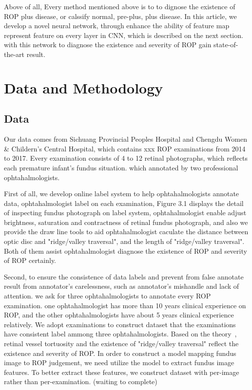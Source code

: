\documentclass[10pt,twocolumn,letterpaper]{article}
\begin{document}
  Above of all,
  Every method mentioned above is to to dignose the existence of ROP plus disease, or calssify normal, pre-plus, plus
  disease. In this article, we develop a novel neural network, through enhance the ability of feature map represent feature on every layer in CNN, which is described on the next section. with this network to diagnose the existence and severity of ROP gain state-of-the-art result.

\section{Data and Methodology}
\subsection{Data}
	Our data comes from Sichuang Provincial Peoples Hospital and Chengdu Women \& Childern's Central Hospital, which contains xxx ROP examinations from 2014 to 2017. Every examination consists of 4 to 12 retinal photographs, which reflects each premature infant's fundus situation.
  which annotated by two professional ophtahalmologists.

  First of all, we develop online label system to help ophtahalmologists annotate data, ophtahalmologist label on each examination, Figure 3.1 displays the detail of inspecting fundus photograph on label system, ophtahalmologist enable adjust brightness, saturation and contractness of retinal fundus photograph, and also we provide the draw line tools to aid ophtahalmologist caculate the distance between optic disc and "ridge/valley traversal", and the length of "ridge/valley traversal". Both of them assist ophtahalmologist diagnose the existence of ROP and severity of ROP certainly.

  Second, to ensure the consistence of data labels and prevent from false annotate result from annotator's carelessness, such as annotator's mishandle and lack of attention. we ask for three ophtahalmologists to annotate every ROP examination. one ophtahalmologist has more than 10 years clinical experience on ROP, and the other ophtahalmologists have about 5 years clinical experience relatively. We adopt examinations to construct dataset that the examinations have consistent label ammong three ophtahalmologists. Based on the theory~\cite{Alpher01}, retinal vessel tortuosity and the existence of "ridge/valley traversal" reflect the existence and severity of ROP. In order to construct a model mapping fundus image to ROP judgement, we need utilize the model to extract fundus image features. To better extract these features, we construct dataset with per-image rather than per-examination. (waiting to complete)
\end{document}
